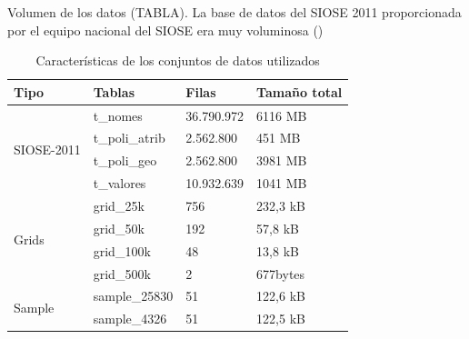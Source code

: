 Volumen de los datos (TABLA). La base de datos del SIOSE 2011 proporcionada por el equipo nacional del SIOSE era muy voluminosa ()

\begin{table}[]
\centering
\caption{Características de los conjuntos de datos utilizados\label{tab:datos}}
\begin{tabular}{@{}llll@{}}
\toprule
\textbf{Tipo}               & \textbf{Tablas} & \textbf{Filas} & \textbf{Tamaño total} \\ \midrule
\multirow{4}{*}{SIOSE-2011} & t\_nomes        & 36.790.972     & 6116 MB               \\
                            & t\_poli\_atrib  & 2.562.800      & 451 MB                \\
                            & t\_poli\_geo    & 2.562.800      & 3981 MB               \\
                            & t\_valores      & 10.932.639     & 1041 MB               \\ \midrule
\multirow{4}{*}{Grids}      & grid\_25k       & 756            & 232,3 kB              \\
                            & grid\_50k       & 192            & 57,8 kB               \\
                            & grid\_100k      & 48             & 13,8 kB               \\
                            & grid\_500k      & 2              & 677bytes              \\ \midrule
\multirow{2}{*}{Sample}     & sample\_25830   & 51             & 122,6 kB              \\
                            & sample\_4326    & 51             & 122,5 kB              \\ \bottomrule
\end{tabular}
\end{table}

